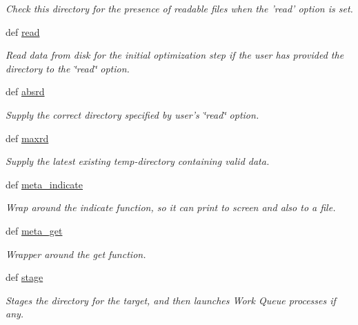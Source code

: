 \begin{DoxyCompactItemize}
\begin{DoxyCompactList}\small\item\em Check this directory for the presence of readable files when the 'read' option is set. \end{DoxyCompactList}\item 
def \hyperlink{classforcebalance_1_1target_1_1Target_afb87b4d33b88bb381c74b76752c5892a}{read}
\begin{DoxyCompactList}\small\item\em Read data from disk for the initial optimization step if the user has provided the directory to the \char`\"{}read\char`\"{} option. \end{DoxyCompactList}\item 
def \hyperlink{classforcebalance_1_1target_1_1Target_abb0a6089d8deaead8f78186cc8e4cbe4}{absrd}
\begin{DoxyCompactList}\small\item\em Supply the correct directory specified by user's \char`\"{}read\char`\"{} option. \end{DoxyCompactList}\item 
def \hyperlink{classforcebalance_1_1target_1_1Target_a961ce7e772836b1465cb44e3f03145df}{maxrd}
\begin{DoxyCompactList}\small\item\em Supply the latest existing temp-\/directory containing valid data. \end{DoxyCompactList}\item 
def \hyperlink{classforcebalance_1_1target_1_1Target_a99c84ef8ea504d7699c927e261f648e4}{meta\-\_\-indicate}
\begin{DoxyCompactList}\small\item\em Wrap around the indicate function, so it can print to screen and also to a file. \end{DoxyCompactList}\item 
def \hyperlink{classforcebalance_1_1target_1_1Target_a17c8ac0c7dd0a0430accddfd12602103}{meta\-\_\-get}
\begin{DoxyCompactList}\small\item\em Wrapper around the get function. \end{DoxyCompactList}\item 
def \hyperlink{classforcebalance_1_1target_1_1Target_af8d2a4658c87841e40296795aec478bb}{stage}
\begin{DoxyCompactList}\small\item\em Stages the directory for the target, and then launches Work Queue processes if any. \end{DoxyCompactList}\item 

\end{DoxyCompactItemize}

